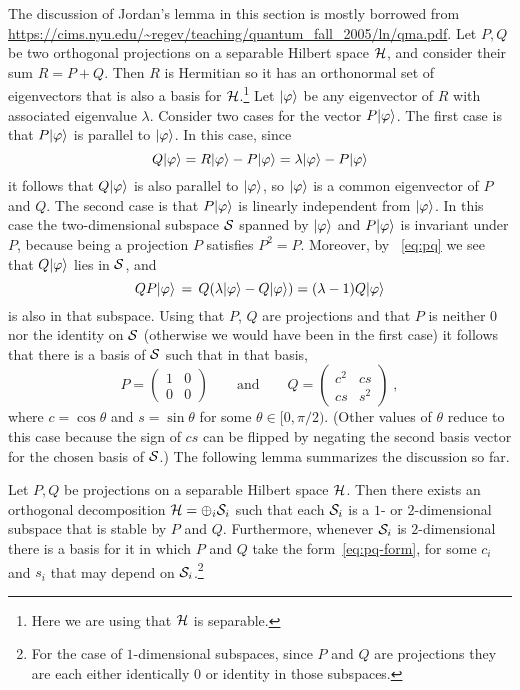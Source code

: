 The discussion of Jordan's lemma in this section is mostly borrowed from \url{https://cims.nyu.edu/~regev/teaching/quantum_fall_2005/ln/qma.pdf}. Let $P,Q$ be two orthogonal projections on a separable Hilbert space $\mathcal{H}$, and consider their sum $R=P+Q$. Then $R$ is Hermitian so it has an orthonormal set of eigenvectors that is also a basis for $\mathcal{H}$.\footnote{Here we are using that $\mathcal{H}$ is separable.} Let $|\varphi\rangle$ be  any eigenvector of $R$ with associated eigenvalue $\lambda$. Consider two cases for the vector $P|\varphi\rangle$. The first case is that $P|\varphi\rangle$ is parallel to $|\varphi\rangle$. In this case, since
\begin{equation}\label{eq:pq}
Q|\varphi\rangle = R|\varphi\rangle - P|\varphi\rangle = \lambda |\varphi\rangle - P |\varphi\rangle
\end{equation}
it follows that $Q|\varphi\rangle$ is also parallel to $|\varphi\rangle$, so $|\varphi\rangle$ is a common eigenvector of $P$ and $Q$. The second case is that $P|\varphi\rangle$ is linearly independent from $|\varphi\rangle$. In this case the two-dimensional subspace $\mathcal{S}$ spanned by $|\varphi\rangle$ and $P|\varphi\rangle$ is invariant under $P$, because being a projection $P$ satisfies $P^2=P$. Moreover, by
~\eqref{eq:pq} we see that $Q|\varphi\rangle$ lies in $\mathcal{S}$, and  
\[ Q P |\varphi\rangle \,=\, Q (\lambda |\varphi\rangle  - Q |\varphi\rangle) = (\lambda-1)Q |\varphi\rangle\]
is also in that subspace. Using that $P$, $Q$ are projections and that $P$ is neither $0$ nor the identity on $\mathcal{S}$ (otherwise we would have been in the first case) it follows that there is a basis of $\mathcal{S}$ such that in that basis, 
\begin{equation}\label{eq:pq-form}
 P = \begin{pmatrix} 1 & 0 \\ 0 & 0 \end{pmatrix} \qquad \text{and} \qquad Q = \begin{pmatrix} c^2 & cs \\ cs & s^2 \end{pmatrix}\;,
\end{equation}
where $c = \cos\theta$ and $s=\sin\theta$ for some $\theta \in [0,\pi/2)$. (Other values of $\theta$ reduce to this case because the sign of $cs$ can be flipped by negating the second basis vector for the chosen basis of $\mathcal{S}$.) The following lemma summarizes the discussion so far. 

\begin{lemma}\label{lem:cs-dec}
Let $P,Q$ be projections on a separable Hilbert space $\mathcal{H}$. Then there exists an orthogonal decomposition $\mathcal{H} = \oplus_i \mathcal{S}_i$ such that each $\mathcal{S}_i$ is a $1$- or $2$-dimensional subspace that is stable by $P$ and $Q$. Furthermore, whenever $\mathcal{S}_i$ is $2$-dimensional there is a basis for it in which $P$ and $Q$ take the form~\eqref{eq:pq-form}, for some $c_i$ and $s_i$ that may depend on $\mathcal{S}_i$.\footnote{For the case of $1$-dimensional subspaces, since $P$ and $Q$ are projections they are each either identically $0$ or identity in those subspaces.}
\end{lemma} 

